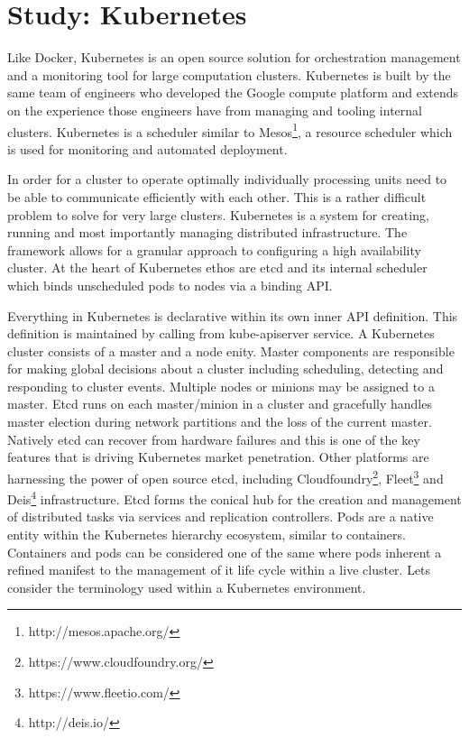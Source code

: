 \documentclass{article}
\begin{document}
\section{Study: Kubernetes}
Like Docker, Kubernetes is an open source solution for orchestration management and a monitoring tool for large computation clusters. Kubernetes is built by the same team of engineers who developed the Google compute platform and extends on the experience those engineers have from managing and tooling internal clusters. Kubernetes is a scheduler similar to Mesos\footnote{http://mesos.apache.org/}, a resource scheduler which is used for monitoring and automated deployment.
\par
In order for a cluster to operate optimally individually processing units need to be able to communicate efficiently with each other. This is a rather difficult problem to solve for very large clusters. Kubernetes is a system for creating, running and most importantly managing distributed infrastructure. The framework allows for a granular approach to configuring a high availability cluster. At the heart of Kubernetes ethos are etcd and its internal scheduler which binds unscheduled pods to nodes via a binding API.
\par
Everything in Kubernetes is declarative within its own inner API definition. This definition is maintained by calling from kube-apiserver service. A Kubernetes cluster consists of a master and a node enity. Master components are responsible for making global decisions about a cluster including scheduling, detecting and responding to cluster events. Multiple nodes or minions may be assigned to a master. Etcd runs on each master/minion in a cluster and gracefully handles master election during network partitions and the loss of the current master. Natively etcd can recover from hardware failures and this is one of the key features that is driving Kubernetes market penetration. Other platforms are harnessing the power of open source etcd, including Cloudfoundry\footnote{https://www.cloudfoundry.org/}, Fleet\footnote{https://www.fleetio.com/} and Deis\footnote{http://deis.io/} infrastructure. Etcd forms the conical hub for the creation and management of distributed tasks via services and replication controllers. Pods are a native entity within the Kubernetes hierarchy ecosystem, similar to containers. Containers and pods can be considered one of the same where pods inherent a refined manifest to the management of it life cycle within a live cluster.  Lets consider the terminology used within a Kubernetes environment.
\end{document}
